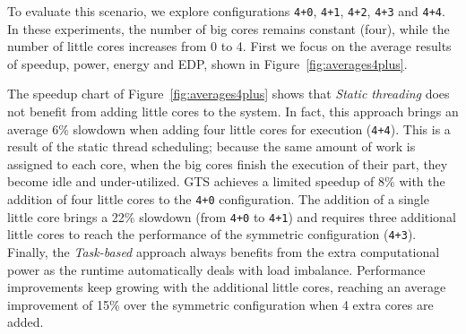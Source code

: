 To evaluate this scenario, we explore configurations \texttt{4+0}, \texttt{4+1}, \texttt{4+2}, \texttt{4+3} and \texttt{4+4}. In these experiments, the number of big cores remains constant (four), while the number of little cores increases from 0 to 4. First we focus on the average results of speedup, power, energy and EDP, shown in Figure~\ref{fig:averages4plus}.

The speedup chart of Figure~\ref{fig:averages4plus} shows that \emph{Static threading} does not benefit from adding little cores to the system.
In fact, this approach brings an average 6\% slowdown when adding four little cores for execution (\texttt{4+4}).
This is a result of the static thread scheduling; because the same amount of work is assigned to each core, when the big cores finish the execution of their part, they become idle and under-utilized. 
GTS achieves a limited speedup of 8\% with the addition of four little cores to the \texttt{4+0} configuration. The addition of a single little core brings a 22\% slowdown (from \texttt{4+0} to \texttt{4+1}) and requires three additional little cores to reach the performance of the symmetric configuration (\texttt{4+3}).  Finally, the \emph{Task-based} approach always benefits from the extra computational power as the runtime automatically deals with load imbalance. Performance improvements keep growing with the additional little cores, reaching an average improvement of 15\% over the symmetric configuration when 4 extra cores are added. 



